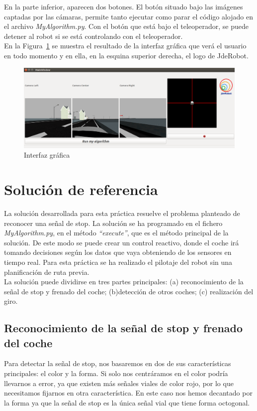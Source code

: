 En la parte inferior, aparecen dos botones. El botón situado bajo las imágenes captadas por las cámaras, permite tanto ejecutar como parar el código alojado en el archivo \textit{MyAlgorithm.py}. Con el botón que está bajo el teleoperador, se puede detener al robot si se está controlando con el teleoperador. \\


En la Figura~\ref{fig.stopGUI} se muestra el resultado de la interfaz gráfica que verá el usuario en todo momento y en ella, en la esquina superior derecha, el logo de JdeRobot.

\begin{figure}[H]
  \begin{center}
    \includegraphics[width=1.0\textwidth]{figures/Stop/stopGUI.png}
		\caption{Interfaz gráfica}
		\label{fig.stopGUI}
		\end{center}
\end{figure}


\section{Solución de referencia}
La solución desarrollada para esta práctica resuelve el problema planteado de reconocer una señal de stop. La solución se ha programado en el fichero \textit{MyAlgorithm.py}, en el método \textit{``execute''}, que es el método principal de la solución. De este modo se puede crear un control reactivo, donde el coche irá tomando decisiones según los datos que vaya obteniendo de los sensores en tiempo real. Para esta práctica se ha realizado el pilotaje del robot sin una planificación de ruta previa.\\

La solución puede dividirse en tres partes principales: (a) reconocimiento de la señal de stop y frenado del coche; (b)detección de otros coches; (c) realización del giro. 

\subsection{Reconocimiento de la señal de stop y frenado del coche}
Para detectar la señal de stop, nos basaremos en dos de sus características principales: el color y la forma. Si solo nos centráramos en el color podría llevarnos a error, ya que existen más señales viales de color rojo, por lo que necesitamos fijarnos en otra característica. En este caso nos hemos decantado por la forma ya que la señal de stop es la única señal vial que tiene forma octogonal. \\

